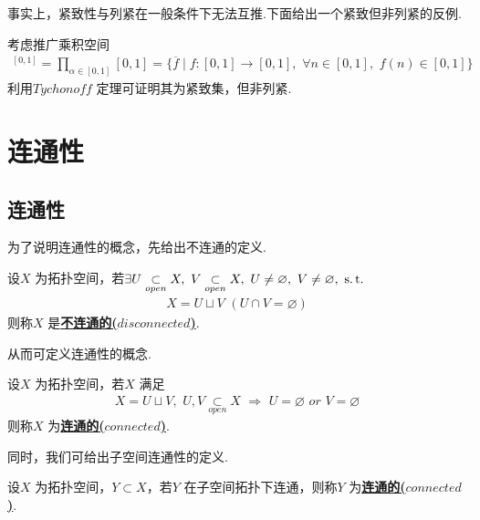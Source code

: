 	\vspace*{2em}
	事实上，紧致性与列紧在一般条件下无法互推.下面给出一个紧致但非列紧的反例.
	\begin{example}\label{ex 2.2.3}
		考虑推广乘积空间
		\begin{align}
			[0 , 1]^{[0 , 1]} = \prod_{\alpha \in [0 , 1]}{[0 , 1]} = \{ \overline{f} \mid f : [0 , 1] \longrightarrow [0 , 1] , \,\, \forall n \in [0 , 1] , \,\, f(n) \in [0 , 1] \}
		\end{align}
		利用\textbf{$Tychonoff$} 定理可证明其为紧致集，但非列紧.
	\end{example}

\newpage
\section{连通性}
\subsection{连通性}
	为了说明连通性的概念，先给出不连通的定义.
	\begin{defn}
		设$X$ 为拓扑空间，若$\exists U \underset{open}{\subset} X , \,\, V \underset{open}{\subset} X , \,\, U \neq \varnothing , \,\, V \neq \varnothing , \,\, \operatorname{s.t.}$
		\begin{align}
			X = U \sqcup V \,\, (U \cap V = \varnothing)
		\end{align}
		则称$X$ 是\underline{\textbf{不连通的($disconnected$)}}.
	\end{defn}

	\vspace*{2em}
	从而可定义连通性的概念.
	\begin{defn}
		设$X$ 为拓扑空间，若$X$ 满足
		\begin{align}
				X = U \sqcup V , \,\, U , V \underset{open}{\subset} X \,\, \Rightarrow \,\, U = \varnothing \,\, or \,\, V = \varnothing
		\end{align}
		则称$X$ 为\underline{\textbf{连通的($connected$)}}.
		
		\begin{rmk}
			同时，我们可给出子空间连通性的定义.
			\begin{defn}
				设$X$ 为拓扑空间，$Y \subset X$，若$Y$ 在子空间拓扑下连通，则称$Y$ 为\underline{\textbf{连通的($connected$)}}.
			\end{defn}
		\end{rmk}
	\end{defn}
	
